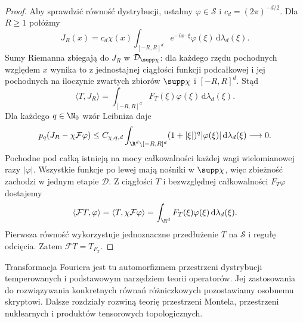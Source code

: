 \begin{proof}
Aby sprawdzić równość dystrybucji, ustalmy
$\varphi\in\mathcal S$ i $c_d=(2\pi)^{-d/2}$.
Dla $R\ge1$ połóżmy
\[
 J_R(x)=c_d\chi(x)\int_{[-R,R]^d}
 e^{-ix\cdot\xi}\varphi(\xi)\,\mathrm d\lambda_d(\xi).
\]
Sumy Riemanna zbiegają do $J_R$ w
$\mathcal D_{\supp\chi}$: dla każdego rzędu pochodnych
względem $x$ wynika to z jednostajnej ciągłości funkcji
podcałkowej i jej pochodnych na iloczynie zwartych
zbiorów $\supp\chi$ i $[-R,R]^d$.
Stąd
\[
 \langle T,J_R\rangle=
 \int_{[-R,R]^d}F_T(\xi)\varphi(\xi)
 \,\mathrm d\lambda_d(\xi).
\]
Dla każdego $q\in\N_0$ wzór Leibniza daje
\[
 p_q(J_R-\chi\mathcal F\varphi)
 \le C_{\chi,q,d}\int_{\R^d\setminus[-R,R]^d}
 (1+|\xi|)^q|\varphi(\xi)|\,\mathrm d\lambda_d(\xi)
 \longrightarrow0.
\]
Pochodne pod całką istnieją na mocy całkowalności
każdej wagi wielomianowej razy $|\varphi|$.
Wszystkie funkcje po lewej mają nośniki w $\supp\chi$,
więc zbieżność zachodzi w jednym etapie $\mathcal D$.
Z ciągłości $T$ i bezwzględnej całkowalności
$F_T\varphi$ dostajemy
\[
 \langle\mathcal FT,\varphi\rangle
 =\langle T,\chi\mathcal F\varphi\rangle
 =\int_{\R^d}F_T(\xi)\varphi(\xi)
 \,\mathrm d\lambda_d(\xi).
\]
Pierwsza równość wykorzystuje jednoznaczne przedłużenie
$T$ na $\mathcal S$ i regułę odcięcia.
Zatem $\mathcal FT=T_{F_T}$.
\end{proof}

\begin{uwaga}
\label{rem:scope22}
Transformacja Fouriera jest tu automorfizmem przestrzeni
dystrybucji temperowanych i podstawowym narzędziem teorii
operatorów. Jej zastosowania do rozwiązywania konkretnych
równań różniczkowych pozostawiamy osobnemu skryptowi.
Dalsze rozdziały rozwiną teorię przestrzeni Montela,
przestrzeni nuklearnych i produktów tensorowych topologicznych.
\end{uwaga}
